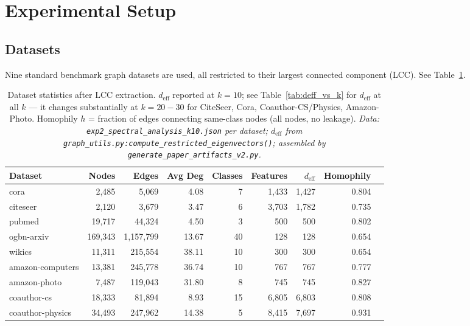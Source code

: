 \documentclass[11pt]{article}
\begin{document}
\section{Experimental Setup}
\label{sec:setup}

\subsection{Datasets}

Nine standard benchmark graph datasets are used, all restricted to their largest
connected component (LCC).  See Table~\ref{tab:dataset_statistics}.

\begin{table}[H]
\centering\small\setlength{\tabcolsep}{5pt}
\caption{Dataset statistics after LCC extraction. $d_{\mathrm{eff}}$ reported at $k{=}10$;
see Table~\ref{tab:deff_vs_k} for $d_{\mathrm{eff}}$ at all $k$ --- it changes substantially
at $k{=}20{-}30$ for CiteSeer, Cora, Coauthor-CS/Physics, Amazon-Photo.
Homophily $h$ = fraction of edges connecting same-class nodes (all nodes, no leakage).
\textit{\scriptsize Data: \texttt{exp2\_spectral\_analysis\_k10.json} per dataset;
$d_{\mathrm{eff}}$ from \texttt{graph\_utils.py:compute\_restricted\_eigenvectors()};
assembled by \texttt{generate\_paper\_artifacts\_v2.py}.}}
\label{tab:dataset_statistics}
\begin{tabular}{lrrrrrrrr}
\toprule
Dataset & Nodes & Edges & Avg Deg & Classes & Features & $d_{\mathrm{eff}}$ & Homophily \\
\midrule
cora & 2,485 & 5,069 & 4.08 & 7 & 1,433 & 1,427 & 0.804 \\
citeseer & 2,120 & 3,679 & 3.47 & 6 & 3,703 & 1,782 & 0.735 \\
pubmed & 19,717 & 44,324 & 4.50 & 3 & 500 & 500 & 0.802 \\
ogbn-arxiv & 169,343 & 1,157,799 & 13.67 & 40 & 128 & 128 & 0.654 \\
wikics & 11,311 & 215,554 & 38.11 & 10 & 300 & 300 & 0.654 \\
amazon-computers & 13,381 & 245,778 & 36.74 & 10 & 767 & 767 & 0.777 \\
amazon-photo & 7,487 & 119,043 & 31.80 & 8 & 745 & 745 & 0.827 \\
coauthor-cs & 18,333 & 81,894 & 8.93 & 15 & 6,805 & 6,803 & 0.808 \\
coauthor-physics & 34,493 & 247,962 & 14.38 & 5 & 8,415 & 7,697 & 0.931 \\
\bottomrule
\end{tabular}
\end{table}
\end{document}
